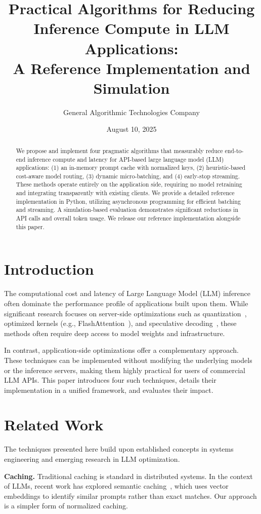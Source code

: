 \documentclass[11pt]{article}
\title{Practical Algorithms for Reducing Inference Compute in LLM Applications: \\ A Reference Implementation and Simulation}
\author{General Algorithmic Technologies Company}
\date{August 10, 2025}
\begin{document}
\maketitle

\begin{abstract}
We propose and implement four pragmatic algorithms that measurably reduce end-to-end inference compute and latency for API-based large language model (LLM) applications: (1) an in-memory prompt cache with normalized keys, (2) heuristic-based cost-aware model routing, (3) dynamic micro-batching, and (4) early-stop streaming. These methods operate entirely on the application side, requiring no model retraining and integrating transparently with existing clients. We provide a detailed reference implementation in Python, utilizing asynchronous programming for efficient batching and streaming. A simulation-based evaluation demonstrates significant reductions in API calls and overall token usage. We release our reference implementation alongside this paper.
\end{abstract}

\section{Introduction}
The computational cost and latency of Large Language Model (LLM) inference often dominate the performance profile of applications built upon them. While significant research focuses on server-side optimizations such as quantization~\cite{frantar2022gptq}, optimized kernels (e.g., FlashAttention~\cite{dao2022flashattention}), and speculative decoding~\cite{leviathan2023fast}, these methods often require deep access to model weights and infrastructure.

In contrast, application-side optimizations offer a complementary approach. These techniques can be implemented without modifying the underlying models or the inference servers, making them highly practical for users of commercial LLM APIs. This paper introduces four such techniques, details their implementation in a unified framework, and evaluates their impact.

\section{Related Work}
The techniques presented here build upon established concepts in systems engineering and emerging research in LLM optimization.

\noindent\textbf{Caching.} Traditional caching is standard in distributed systems. In the context of LLMs, recent work has explored semantic caching~\cite{sharma2023caching}, which uses vector embeddings to identify similar prompts rather than exact matches. Our approach is a simpler form of normalized caching.
\end{document}
